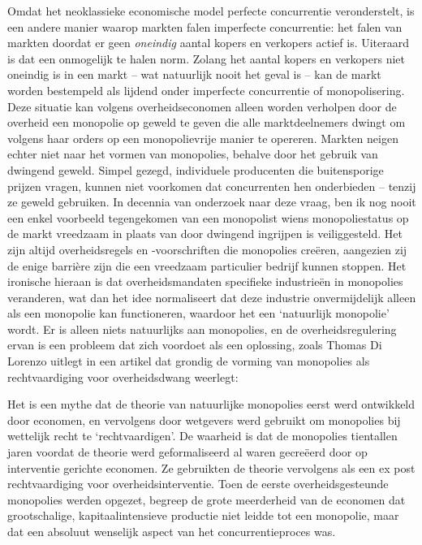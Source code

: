 Omdat het neoklassieke economische model perfecte concurrentie veronderstelt, is een andere manier waarop markten falen imperfecte concurrentie: het falen van markten doordat er geen \textit{oneindig} aantal kopers en verkopers actief is. Uiteraard is dat een onmogelijk te halen norm. Zolang het aantal kopers en verkopers niet oneindig is in een markt -- wat natuurlijk nooit het geval is -- kan de markt worden bestempeld als lijdend onder imperfecte concurrentie of monopolisering. Deze situatie kan volgens overheidseconomen alleen worden verholpen door de overheid een monopolie op geweld te geven die alle marktdeelnemers dwingt om volgens haar orders op een monopolievrije manier te opereren. Markten neigen echter niet naar het vormen van monopolies, behalve door het gebruik van dwingend geweld. Simpel gezegd, individuele producenten die buitensporige prijzen vragen, kunnen niet voorkomen dat concurrenten hen onderbieden -- tenzij ze geweld gebruiken. In decennia van onderzoek naar deze vraag, ben ik nog nooit een enkel voorbeeld tegengekomen van een monopolist wiens monopoliestatus op de markt vreedzaam in plaats van door dwingend ingrijpen is veiliggesteld. Het zijn altijd overheidsregels en -voorschriften die monopolies creëren, aangezien zij de enige barrière zijn die een vreedzaam particulier bedrijf kunnen stoppen. Het ironische hieraan is dat overheidsmandaten specifieke industrieën in monopolies veranderen, wat dan het idee normaliseert dat deze industrie onvermijdelijk alleen als een monopolie kan functioneren, waardoor het een `natuurlijk monopolie' wordt. Er is alleen niets natuurlijks aan monopolies, en de overheidsregulering ervan is een probleem dat zich voordoet als een oplossing, zoals Thomas Di Lorenzo uitlegt in een artikel dat grondig de vorming van monopolies als rechtvaardiging voor overheidsdwang weerlegt:\autocite{186}

\begin{blockquotebox}
Het is een mythe dat de theorie van natuurlijke monopolies eerst werd ontwikkeld door economen, en vervolgens door wetgevers werd gebruikt om monopolies bij wettelijk recht te `rechtvaardigen'. De waarheid is dat de monopolies tientallen jaren voordat de theorie werd geformaliseerd al waren gecreëerd door op interventie gerichte economen. Ze gebruikten de theorie vervolgens als een ex post rechtvaardiging voor overheidsinterventie. Toen de eerste overheidsgesteunde monopolies werden opgezet, begreep de grote meerderheid van de economen dat grootschalige, kapitaalintensieve productie niet leidde tot een monopolie, maar dat een absoluut wenselijk aspect van het concurrentieproces was.
\end{blockquotebox}

